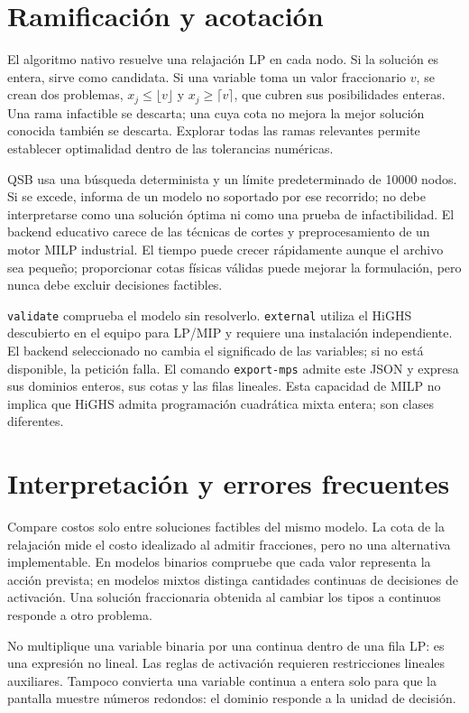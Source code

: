 \section{Ramificación y acotación}
El algoritmo nativo resuelve una relajación LP en cada nodo. Si la solución es
entera, sirve como candidata. Si una variable toma un valor fraccionario \(v\),
se crean dos problemas, \(x_j\leq\lfloor v\rfloor\) y
\(x_j\geq\lceil v\rceil\), que cubren sus posibilidades enteras. Una rama
infactible se descarta; una cuya cota no mejora la mejor solución conocida
también se descarta. Explorar todas las ramas relevantes permite establecer
optimalidad dentro de las tolerancias numéricas.

QSB usa una búsqueda determinista y un límite predeterminado de 10000 nodos.
Si se excede, informa de un modelo no soportado por ese recorrido; no debe
interpretarse como una solución óptima ni como una prueba de infactibilidad.
El backend educativo carece de las técnicas de cortes y preprocesamiento de
un motor MILP industrial. El tiempo puede crecer rápidamente aunque el
archivo sea pequeño; proporcionar cotas físicas válidas puede mejorar la
formulación, pero nunca debe excluir decisiones factibles.

\texttt{validate} comprueba el modelo sin resolverlo.
\texttt{external} utiliza el HiGHS descubierto en el equipo para LP/MIP y
requiere una instalación independiente. El backend seleccionado no cambia
el significado de las variables; si no está disponible, la petición falla.
El comando \texttt{export-mps} admite este JSON y expresa sus dominios enteros,
sus cotas y las filas lineales. Esta capacidad de MILP no implica que HiGHS
admita programación cuadrática mixta entera; son clases diferentes.

\section{Interpretación y errores frecuentes}
Compare costos solo entre soluciones factibles del mismo modelo. La cota de
la relajación mide el costo idealizado al admitir fracciones, pero no una
alternativa implementable. En modelos binarios compruebe que cada valor
representa la acción prevista; en modelos mixtos distinga cantidades continuas
de decisiones de activación. Una solución fraccionaria obtenida al cambiar los
tipos a continuos responde a otro problema.

No multiplique una variable binaria por una continua dentro de una fila LP:
es una expresión no lineal. Las reglas de activación requieren restricciones
lineales auxiliares. Tampoco convierta una variable continua a entera solo
para que la pantalla muestre números redondos: el dominio responde a la
unidad de decisión.

